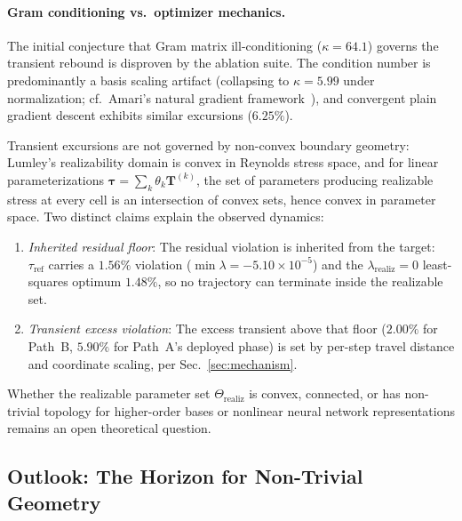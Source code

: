 \documentclass[preprint,aps,prb,longbibliography,superscriptaddress]{revtex4-2}
\newcommand{\tref}{\tau_{\text{ref}}}
\begin{document}
\paragraph{Gram conditioning vs.\ optimizer mechanics.}
The initial conjecture that Gram matrix ill-conditioning ($\kappa = 64.1$)
governs the transient rebound is disproven by the ablation suite. The condition
number is predominantly a basis scaling artifact (collapsing to $\kappa = 5.99$
under normalization; cf.~Amari's natural gradient framework~\cite{Amari1998}), and convergent plain gradient descent exhibits similar
excursions ($6.25\%$).

Transient excursions are not governed by non-convex boundary geometry:
Lumley's realizability domain is convex in Reynolds stress space, and for linear
parameterizations $\bm{\tau} = \sum_k \theta_k \bm{T}^{(k)}$, the set of parameters
producing realizable stress at every cell is an intersection of convex sets, hence
convex in parameter space. Two distinct claims explain the observed dynamics:
\begin{enumerate}
  \item \emph{Inherited residual floor}: The residual violation is inherited from
    the target: $\tref$ carries a $1.56\%$ violation ($\min \lambda = -5.10 \times 10^{-5}$)
    and the $\lambda_{\mathrm{realiz}} = 0$ least-squares optimum $1.48\%$, so no
    trajectory can terminate inside the realizable set.
  \item \emph{Transient excess violation}: The excess transient above that floor
    ($2.00\%$ for Path~B, $5.90\%$ for Path~A's deployed phase) is set by per-step
    travel distance and coordinate scaling, per Sec.~\ref{sec:mechanism}.
\end{enumerate}
Whether the realizable parameter set $\Theta_{\mathrm{realiz}}$ is convex, connected,
or has non-trivial topology for higher-order bases or nonlinear neural network
representations remains an open theoretical question.

\subsection{Outlook: The Horizon for Non-Trivial Geometry}
\label{sec:outlook}
\end{document}
